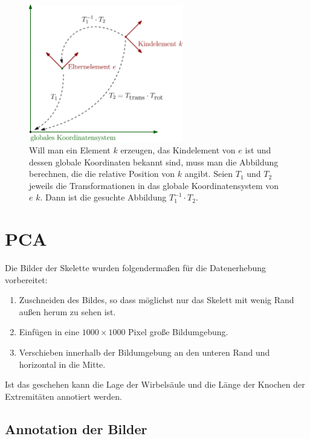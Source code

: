 \begin{figure}
 \centering
 \includegraphics[width=0.6\textwidth]{graphics/transformation_matrices_spine.eps}
 \caption{Will man ein Element $k$ erzeugen, das Kindelement von $e$ ist und dessen globale Koordinaten bekannt sind, muss man die Abbildung berechnen, die die relative Position von $k$ angibt. Seien $T_1$ und $T_2$ jeweils die Transformationen in das globale Koordinatensystem von $e$ \bzw $k$. Dann ist die gesuchte Abbildung $T_1^{-1} \cdot T_2$.}
\end{figure}


\section{PCA}
\label{implementation_detail_pca}

Die Bilder der Skelette wurden folgendermaßen für die Datenerhebung vorbereitet:
 
 \begin{enumerate}
  \item Zuschneiden des Bildes, so dass möglichst nur das Skelett mit wenig Rand außen herum zu sehen ist.
  \item Einfügen in eine $1000 \times 1000$ Pixel große Bildumgebung.
  \item Verschieben innerhalb der Bildumgebung an den unteren Rand und horizontal in die Mitte.
 \end{enumerate}

 Ist das geschehen kann die Lage der Wirbelsäule und die Länge der Knochen der Extremitäten annotiert werden.
 
\subsection{Annotation der Bilder}

